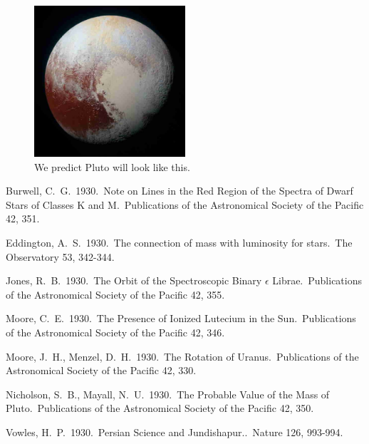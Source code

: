 \documentclass{lowell-prop}
\begin{document}
 \begin{figure}[h]
   \includegraphics[width=0.5\textwidth]{pluto-small.eps} %
      \caption{We predict Pluto will look like this.}\label{fig:name}
 \end{figure}



\begin{thebibliography}{99}
 Burwell, C.~G.\ 1930.\ Note on 
Lines in the Red Region of the Spectra of Dwarf Stars of Classes K and M.\ 
Publications of the Astronomical Society of the Pacific 42, 351. 

 Eddington, A.~S.\ 1930.\ The 
connection of mass with luminosity for stars.\ The Observatory 53, 342-344. 

 Jones, R.~B.\ 1930.\ The Orbit 
of the Spectroscopic Binary {$\epsilon$} Librae.\ Publications of the 
Astronomical Society of the Pacific 42, 355. 

 Moore, C.~E.\ 1930.\ The 
Presence of Ionized Lutecium in the Sun.\ Publications of the Astronomical 
Society of the Pacific 42, 346. 

 Moore, J.~H., Menzel, 
D.~H.\ 1930.\ The Rotation of Uranus.\ Publications of the Astronomical 
Society of the Pacific 42, 330. 

 Nicholson, S.~B., 
Mayall, N.~U.\ 1930.\ The Probable Value of the Mass of Pluto.\ 
Publications of the Astronomical Society of the Pacific 42, 350. 

\bibitem{1930Natur.126..993V} Vowles, H.~P.\ 1930.\ Persian 
Science and Jundishapur..\ Nature 126, 993-994. 

\end{thebibliography}
\end{document}
